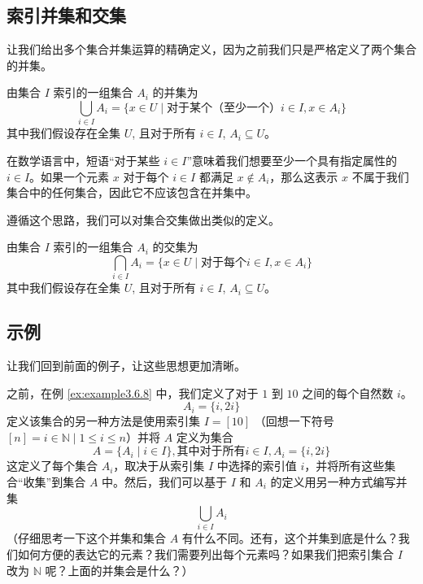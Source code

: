 \subsection{索引并集和交集}\label{sec:section3.6.2}

让我们给出多个集合并集运算的精确定义，因为之前我们只是严格定义了两个集合的并集。

\begin{definition}\label{def:definition3.6.1}
    由集合 $I$ 索引的一组集合 $A_i$ 的并集为
    \[\bigcup_{i \in I} A_i = \{x \in U \mid \text{对于某个（至少一个）} i \in I, x \in A_i \}\]
    其中我们假设存在全集 $U$, 且对于所有 $i \in I$, $A_i \subseteq U$。
\end{definition}

在数学语言中，短语``对于某些 $i \in I$''意味着我们想要至少一个具有指定属性的 $i \in I$。如果一个元素 $x$ 对于每个 $i \in I$ 都满足 $x \notin A_i$，那么这表示 $x$ 不属于我们集合中的任何集合，因此它不应该包含在并集中。

遵循这个思路，我们可以对集合交集做出类似的定义。

\begin{definition}\label{def:definition3.6.2}
    由集合 $I$ 索引的一组集合 $A_i$ 的交集为
    \[\bigcap_{i \in I} A_i = \{x \in U \mid \text{对于每个} i \in I, x \in A_i \}\]
    其中我们假设存在全集 $U$, 且对于所有 $i \in I$, $A_i \subseteq U$。
\end{definition}

\subsection{示例}

让我们回到前面的例子，让这些思想更加清晰。

\begin{example}
    之前，在例 \ref{ex:example3.6.8} 中，我们定义了对于 $1$ 到 $10$ 之间的每个自然数 $i$。
    \[A_i = \{i, 2i\}\]
    定义该集合的另一种方法是使用索引集 $I = [10]$ （回想一下符号 $[n] = {i \in \mathbb{N} \mid 1 \le i \le n}$）并将 $A$ 定义为集合
    \[A = \{A_i \mid i \in I\}, \text{其中对于所有} i \in I, A_i = \{i, 2i\}\]
    这定义了每个集合 $A_i$，取决于从索引集 $I$ 中选择的索引值 $i$，并将所有这些集合``收集''到集合 $A$ 中。然后，我们可以基于 $I$ 和 $A_i$ 的定义用另一种方式编写并集
    \[\bigcup_{i \in I} A_i\]
    （仔细思考一下这个并集和集合 $A$ 有什么不同。还有，这个并集到底是什么？我们如何方便的表达它的元素？我们需要列出每个元素吗？如果我们把索引集合 $I$ 改为 $\mathbb{N}$ 呢？上面的并集会是什么？）
\end{example}

